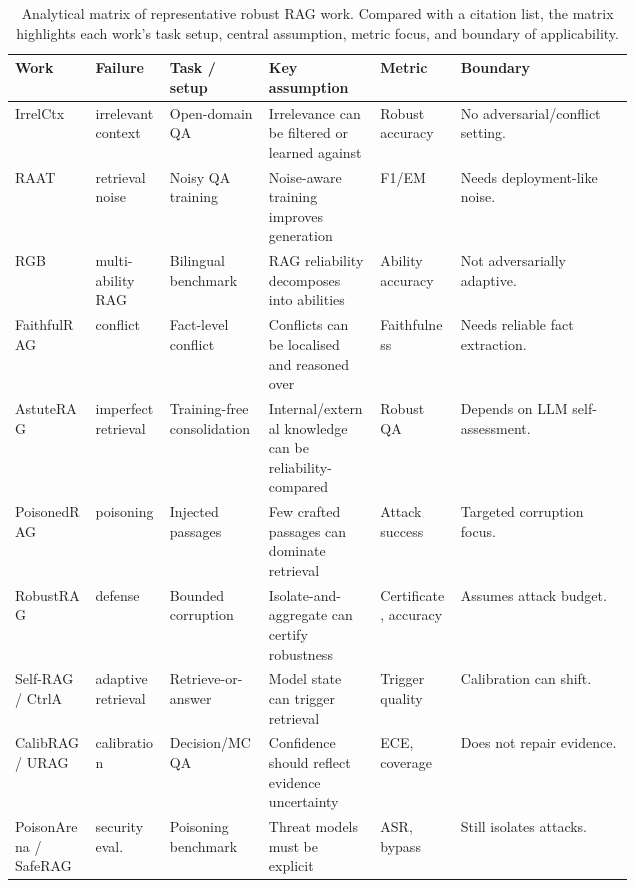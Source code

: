 \begin{table}[t]
\centering
\scriptsize
\renewcommand{\arraystretch}{0.92}
\begin{tabularx}{\linewidth}{>{\raggedright\arraybackslash}p{0.13\linewidth}>{\raggedright\arraybackslash}p{0.12\linewidth}>{\raggedright\arraybackslash}p{0.16\linewidth}>{\raggedright\arraybackslash}p{0.18\linewidth}>{\raggedright\arraybackslash}p{0.13\linewidth}>{\raggedright\arraybackslash}X}
\toprule
\textbf{Work} & \textbf{Failure} & \textbf{Task / setup} & \textbf{Key assumption} & \textbf{Metric} & \textbf{Boundary} \\
\midrule
IrrelCtx & irrelevant context & Open-domain QA & Irrelevance can be filtered or learned against & Robust accuracy & No adversarial/conflict setting. \\
RAAT & retrieval noise & Noisy QA training & Noise-aware training improves generation & F1/EM & Needs deployment-like noise. \\
RGB & multi-ability RAG & Bilingual benchmark & RAG reliability decomposes into abilities & Ability accuracy & Not adversarially adaptive. \\
FaithfulRAG & conflict & Fact-level conflict & Conflicts can be localised and reasoned over & Faithfulness & Needs reliable fact extraction. \\
AstuteRAG & imperfect retrieval & Training-free consolidation & Internal/external knowledge can be reliability-compared & Robust QA & Depends on LLM self-assessment. \\
PoisonedRAG & poisoning & Injected passages & Few crafted passages can dominate retrieval & Attack success & Targeted corruption focus. \\
RobustRAG & defense & Bounded corruption & Isolate-and-aggregate can certify robustness & Certificate, accuracy & Assumes attack budget. \\
Self-RAG / CtrlA & adaptive retrieval & Retrieve-or-answer & Model state can trigger retrieval & Trigger quality & Calibration can shift. \\
CalibRAG / URAG & calibration & Decision/MCQA & Confidence should reflect evidence uncertainty & ECE, coverage & Does not repair evidence. \\
PoisonArena / SafeRAG & security eval. & Poisoning benchmark & Threat models must be explicit & ASR, bypass & Still isolates attacks. \\
\bottomrule
\end{tabularx}
\caption{Analytical matrix of representative robust RAG work. Compared with a citation list, the matrix highlights each work's task setup, central assumption, metric focus, and boundary of applicability.}
\label{tab:analytical-matrix}
\end{table}
